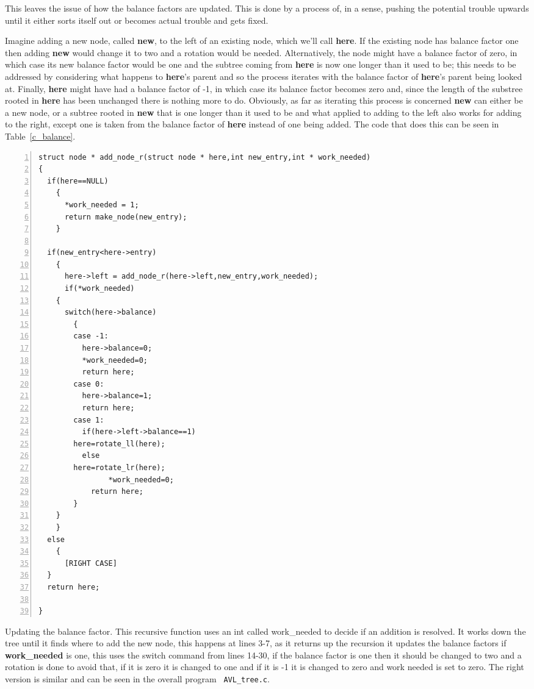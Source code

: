 \documentclass[11pt,a4paper]{scrartcl}
\begin{document}
This leaves the issue of how the balance factors are updated. This is
done by a process of, in a sense, pushing the potential trouble upwards
until it either sorts itself out or becomes actual trouble and gets
fixed.  

Imagine adding a new node, called \textbf{new}, to the left of an
existing node, which we'll call \textbf{here}. If the existing node
has balance factor one then adding \textbf{new} would change it to two
and a rotation would be needed. Alternatively, the node might have a
balance factor of zero, in which case its new balance factor would be
one and the subtree coming from \textbf{here} is now one longer than
it used to be; this needs to be addressed by considering what happens
to \textbf{here}'s parent and so the process iterates with the balance
factor of \textbf{here}'s parent being looked at. Finally,
\textbf{here} might have had a balance factor of -1, in which case its
balance factor becomes zero and, since the length of the substree
rooted in \textbf{here} has been unchanged there is nothing more to
do. Obviously, as far as iterating this process is concerned
\textbf{new} can either be a new node, or a subtree rooted in
\textbf{new} that is one longer than it used to be and what applied to
adding to the left also works for adding to the right, except one is
taken from the balance factor of \textbf{here} instead of one being
added. The code that does this can be seen in Table~\ref{c_balance}.

\begin{table}
\begin{lstlisting}[numbers=left]
struct node * add_node_r(struct node * here,int new_entry,int * work_needed)
{
  if(here==NULL)
    {
      *work_needed = 1;
      return make_node(new_entry);
    }
  
  if(new_entry<here->entry)
    {
      here->left = add_node_r(here->left,new_entry,work_needed);
      if(*work_needed)
	{
	  switch(here->balance)
	    {
	    case -1:
	      here->balance=0;
	      *work_needed=0;
	      return here;
	    case 0:
	      here->balance=1;
	      return here;
	    case 1:
	      if(here->left->balance==1)
		here=rotate_ll(here);
	      else
		here=rotate_lr(here);
       	        *work_needed=0;
	        return here;
	    }
	}
    }
  else
    {
      [RIGHT CASE]
  }
  return here;

}
\end{lstlisting}
\caption{Updating the balance factor. This recursive function uses an
  int called work\_needed to decide if an addition is resolved. It
  works down the tree until it finds where to add the new node, this
  happens at lines 3-7, as it returns up the recursion it updates the
  balance factors if \textbf{work\_needed} is one, this uses the
  switch command from lines 14-30, if the balance factor is one then
  it should be changed to two and a rotation is done to avoid that, if
  it is zero it is changed to one and if it is -1 it is changed to
  zero and work needed is set to zero. The right version is similar
  and can be seen in the overall program \texttt{
    AVL\_tree.c}.\label{c_balance}}
\end{table}
\end{document}
